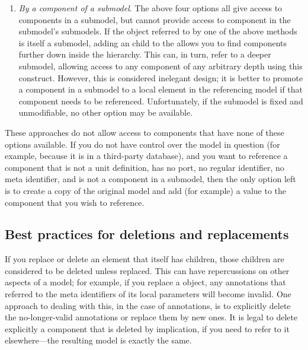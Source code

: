 \begin{enumerate}
\item \emph{By a component of a submodel}.  The above four options all
  give access to components in a submodel, but cannot provide access to
  component in the submodel's submodels.  If the object referred to by
  one of the above methods is itself a submodel, adding an \SBaseRef
  child to the \SBaseRef allows you to find components further down
  inside the hierarchy.  This can, in turn, refer to a deeper submodel,
  allowing access to any component of any arbitrary depth using this
  construct.  However, this is considered inelegant design; it is better
  to promote a component in a submodel to a local element in the
  referencing model if that component needs to be referenced.
  Unfortunately, if the submodel is fixed and unmodifiable, no other
  option may be available.

\end{enumerate}

These approaches do not allow access to components that have none of
these options available.  If you do not have control over the model in
question (for example, because it is in a third-party database), and you
want to reference a component that is not a unit definition, has no
port, no regular identifier, no meta identifier, and is not a component
in a submodel, then the only option left is to create a copy of the
original model and add (for example) a  value to the
component that you wish to reference.


\subsection{Best practices for deletions and replacements}
\label{best-practices-deletions}
\label{best-practices-replacements}

If you replace or delete an element that itself has children, those
children are considered to be deleted unless replaced.  This can have
repercussions on other aspects of a model; for example, if you replace a
\KineticLaw object, any annotations that referred to the meta
identifiers of its local parameters will become invalid.  One approach
to dealing with this, in the case of annotations, is to explicitly
delete the no-longer-valid annotations or replace them by new ones.  It
is legal to delete explicitly a component that is deleted by
implication, if you need to refer to it elsewhere---the resulting model
is exactly the same.



